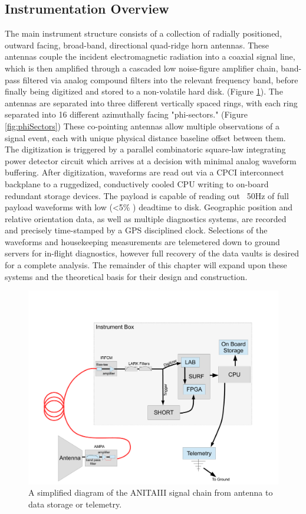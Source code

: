 	
	\subsection{Instrumentation Overview}
	The main instrument structure consists of a collection of radially positioned, outward facing, broad-band, directional quad-ridge horn antennas.  These antennas couple the incident electromagnetic radiation into a coaxial signal line, which is then amplified through a cascaded low noise-figure amplifier chain, band-pass filtered via analog compound filters into the relevant frequency band, before finally being digitized and stored to a non-volatile hard disk. (Figure \ref{fig:RFChainBlockDiagram}).  The antennas are separated into three different vertically spaced rings, with each ring separated into 16 different azimuthally facing "phi-sectors." (Figure \ref{fig:phiSectors})  These co-pointing antennas allow multiple observations of a signal event, each with unique physical distance baseline offset between them.   The digitization is triggered by a parallel combinatoric square-law integrating power detector circuit which arrives at a decision with minimal analog waveform buffering.  After digitization, waveforms are read out via a CPCI interconnect backplane to a ruggedized, conductively cooled CPU writing to on-board redundant storage devices.  The payload is capable of reading out ~50Hz of full payload waveforms with low (\textless 5\% ) deadtime to disk.  Geographic position and relative orientation data, as well as multiple diagnostics systems, are recorded and precisely time-stamped by a GPS disciplined clock.  Selections of the waveforms and housekeeping measurements are telemetered down to ground servers for in-flight diagnostics, however full recovery of the data vaults is desired for a complete analysis.  The remainder of this chapter will expand upon these systems and the theoretical basis for their design and construction.
	
	
\begin{figure}
\centering
	\includegraphics[width=\textwidth]{figures/RFChainBlockDiagram}
	\caption{A simplified diagram of the ANITAIII signal chain from antenna to data storage or telemetry.}
	\label{fig:RFChainBlockDiagram}
\end{figure}

